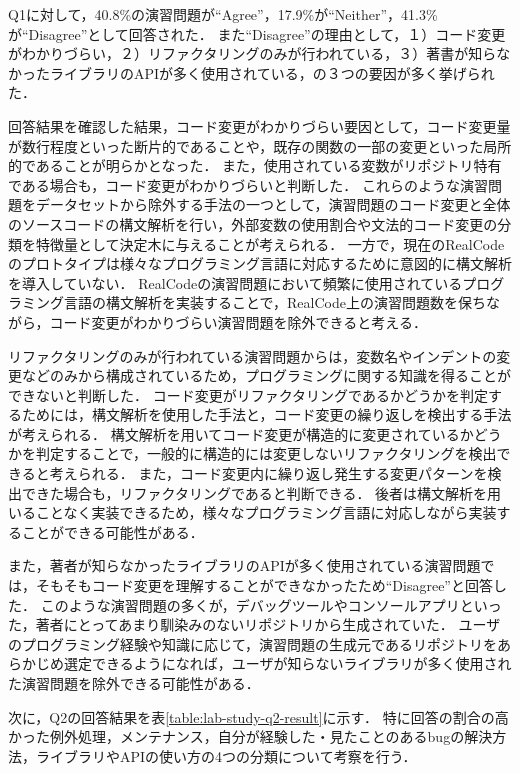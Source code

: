 Q1に対して，40.8\%の演習問題が``Agree''，17.9\%が``Neither''，41.3\%が``Disagree''として回答された．
また``Disagree''の理由として，１）コード変更がわかりづらい，２）リファクタリングのみが行われている，３）著書が知らなかったライブラリのAPIが多く使用されている，の３つの要因が多く挙げられた．

回答結果を確認した結果，コード変更がわかりづらい要因として，コード変更量が数行程度といった断片的であることや，既存の関数の一部の変更といった局所的であることが明らかとなった．
また，使用されている変数がリポジトリ特有である場合も，コード変更がわかりづらいと判断した．
これらのような演習問題をデータセットから除外する手法の一つとして，演習問題のコード変更と全体のソースコードの構文解析を行い，外部変数の使用割合や文法的コード変更の分類を特徴量として決定木に与えることが考えられる．
一方で，現在のRealCodeのプロトタイプは様々なプログラミング言語に対応するために意図的に構文解析を導入していない．
RealCodeの演習問題において頻繁に使用されているプログラミング言語の構文解析を実装することで，RealCode上の演習問題数を保ちながら，コード変更がわかりづらい演習問題を除外できると考える．

リファクタリングのみが行われている演習問題からは，変数名やインデントの変更などのみから構成されているため，プログラミングに関する知識を得ることができないと判断した．
コード変更がリファクタリングであるかどうかを判定するためには，構文解析を使用した手法と，コード変更の繰り返しを検出する手法が考えられる．
構文解析を用いてコード変更が構造的に変更されているかどうかを判定することで，一般的に構造的には変更しないリファクタリングを検出できると考えられる．
また，コード変更内に繰り返し発生する変更パターンを検出できた場合も，リファクタリングであると判断できる．
後者は構文解析を用いることなく実装できるため，様々なプログラミング言語に対応しながら実装することができる可能性がある．

また，著者が知らなかったライブラリのAPIが多く使用されている演習問題では，そもそもコード変更を理解することができなかったため``Disagree''と回答した．
このような演習問題の多くが，デバッグツールやコンソールアプリといった，著者にとってあまり馴染みのないリポジトリから生成されていた．
ユーザのプログラミング経験や知識に応じて，演習問題の生成元であるリポジトリをあらかじめ選定できるようになれば，ユーザが知らないライブラリが多く使用された演習問題を除外できる可能性がある．

次に，Q2の回答結果を表\ref{table:lab-study-q2-result}に示す．
特に回答の割合の高かった例外処理，メンテナンス，自分が経験した・見たことのあるbugの解決方法，ライブラリやAPIの使い方の4つの分類について考察を行う．


